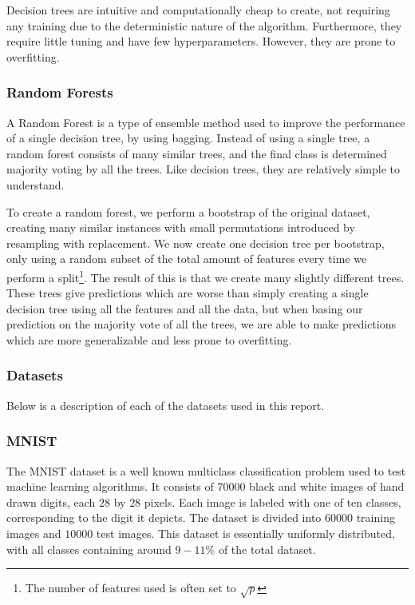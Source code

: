 \documentclass[onecolumn,10pt,cleanfoot]{asme2ej}
\begin{document}
Decision trees are intuitive and computationally cheap to create, not requiring any training due to the deterministic nature of the algorithm. Furthermore, they require little tuning and have few hyperparameters. However, they are prone to overfitting.

\subsubsection{Random Forests}

A Random Forest is a type of ensemble method used to improve the performance of a single decision tree, by using bagging. Instead of using a single tree, a random forest consists of many similar trees, and the final class is determined majority voting by all the trees. Like decision trees, they are relatively simple to understand.

To create a random forest, we perform a bootstrap of the original dataset, creating many similar instances with small permutations introduced by resampling with replacement. We now create one decision tree per bootstrap, only using a random subset of the total amount of features every time we perform a split\footnote{The number of features used is often set to $\sqrt{p}$}. The result of this is that we create many slightly different trees. These trees give predictions which are worse than simply creating a single decision tree using all the features and all the data, but when basing our prediction on the majority vote of all the trees, we are able to make predictions which are more generalizable and less prone to overfitting.

\subsubsection{Datasets}

Below is a description of each of the datasets used in this report.

\subsubsection{MNIST}

The MNIST dataset is a well known multiclass classification problem used to test machine learning algorithms. It consists of $70000$ black and white images of hand drawn digits, each $28$ by $28$ pixels. Each image is labeled with one of ten classes, corresponding to the digit it depicts. The dataset is divided into $60000$ training images and $10000$ test images. This dataset is essentially uniformly distributed, with all classes containing around $9 - 11\%$ of the total dataset.
\end{document}
